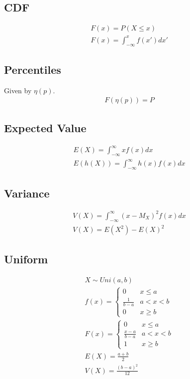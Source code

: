 \subsection{CDF}
\begin{align}
  F(x) = P(X \leq x) \\
  F(x) = \int_{-\infty}^{x} f(x') dx'
\end{align}

\subsection{Percentiles}
Given by $\eta(p)$.
\begin{align}
  F(\eta(p)) = P
\end{align}

\subsection{Expected Value}
\begin{align}
  E(X) = \int_{-\infty}^{\infty} xf(x) dx \\
  E(h(X)) = \int_{-\infty}^{\infty} h(x)f(x) dx
\end{align}

\subsection{Variance}
\begin{align}
  V(X) = \int_{-\infty}^{\infty} (x - M_X)^2f(x) dx \\
  V(X) = E(X^2) - E(X)^2
\end{align}

\subsection{Uniform}
\begin{align}
  X \sim Uni(a, b) \\
  f(x) = \begin{cases}
    0 & x \leq a \\
    \frac{1}{b - a} & a < x < b \\
    0 & x \geq b
  \end{cases} \\
  F(x) = \begin{cases}
    0 & x \leq a \\
    \frac{x - a}{b - a} & a < x < b \\
    1 & x \geq b
  \end{cases} \\
  E(X) = \frac{a + b}{2} \\
  V(X) = \frac{(b - a)^2}{12}
\end{align}

